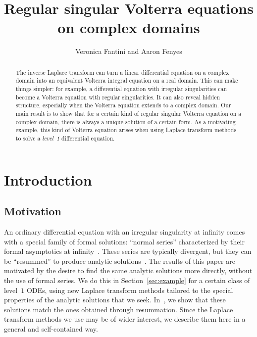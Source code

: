 \documentclass[final]{siamart220329}
\title{Regular singular Volterra equations on complex domains}
\author{Veronica Fantini and Aaron Fenyes}
\date{}
\begin{document}
\maketitle

\begin{abstract}
The inverse Laplace transform can turn a linear differential equation on a complex domain into an equivalent Volterra integral equation on a real domain. This can make things simpler: for example, a differential equation with irregular singularities can become a Volterra equation with regular singularities. It can also reveal hidden structure, especially when the Volterra equation extends to a complex domain. Our main result is to show that for a certain kind of regular singular Volterra equation on a complex domain, there is always a unique solution of a certain form. As a motivating example, this kind of Volterra equation arises when using Laplace transform methods to solve a {\em level~1} differential equation.
\end{abstract}
\tableofcontents
\section{Introduction}\label{sec:intro}
\subsection{Motivation}\label{sec:motivation}
An ordinary differential equation with an irregular singularity at infinity comes with a special family of formal solutions: ``normal series'' characterized by their formal asymptotics at infinity~\cite{int-irreg}. These series are typically divergent, but they can be ``resummed'' to produce analytic solutions~\cite{loday1994stokes,diverg-resurg--ii,loday-Remy2011,malgrange1995sommation,ramis1991series}. The results of this paper are motivated by the desire to find the same analytic solutions more directly, without the use of formal series. We do this in Section~\ref{sec:example} for a certain class of level~$1$ ODEs, using new Laplace transform methods tailored to the special properties of the analytic solutions that we seek. In~\cite{borel_reg}, we show that these solutions match the ones obtained through resummation. Since the Laplace transform methods we use may be of wider interest, we describe them here in a general and self-contained way.
\end{document}
